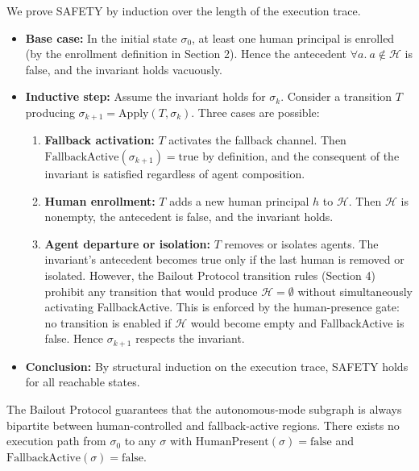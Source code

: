 \begin{block}
We prove SAFETY by induction over the length of the execution trace.

\begin{itemize}
\item \textbf{Base case:} In the initial state $\sigma_0$, at least one human principal is enrolled (by the enrollment definition in Section 2). Hence the antecedent $\forall a.\ a \notin \mathcal{H}$ is false, and the invariant holds vacuously.

\item \textbf{Inductive step:} Assume the invariant holds for $\sigma_k$. Consider a transition $T$ producing $\sigma_{k+1} = \text{Apply}(T, \sigma_k)$. Three cases are possible:

\begin{enumerate}
\item \textbf{Fallback activation:} $T$ activates the fallback channel. Then $\text{FallbackActive}(\sigma_{k+1}) = \text{true}$ by definition, and the consequent of the invariant is satisfied regardless of agent composition.

\item \textbf{Human enrollment:} $T$ adds a new human principal $h$ to $\mathcal{H}$. Then $\mathcal{H}$ is nonempty, the antecedent is false, and the invariant holds.

\item \textbf{Agent departure or isolation:} $T$ removes or isolates agents. The invariant's antecedent becomes true only if the last human is removed or isolated. However, the Bailout Protocol transition rules (Section 4) prohibit any transition that would produce $\mathcal{H} = \emptyset$ without simultaneously activating FallbackActive. This is enforced by the human-presence gate: no transition is enabled if $\mathcal{H}$ would become empty and FallbackActive is false. Hence $\sigma_{k+1}$ respects the invariant.
\end{enumerate}

\item \textbf{Conclusion:} By structural induction on the execution trace, SAFETY holds for all reachable states.
\end{itemize}
\end{block}

\begin{block}[Corollary]
The Bailout Protocol guarantees that the autonomous-mode subgraph is always bipartite between human-controlled and fallback-active regions. There exists no execution path from $\sigma_0$ to any $\sigma$ with $\text{HumanPresent}(\sigma) = \text{false}$ and $\text{FallbackActive}(\sigma) = \text{false}$.
\end{block}

